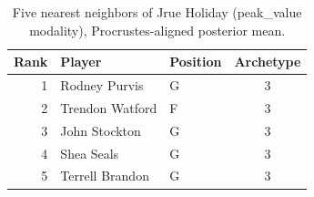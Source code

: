 \begin{table}[htbp]
  \centering\small
  \begin{tabular}{rllc}
    \toprule
    Rank & Player & Position & Archetype \\
    \midrule
    1 & Rodney Purvis & G & 3 \\
    2 & Trendon Watford & F & 3 \\
    3 & John Stockton & G & 3 \\
    4 & Shea Seals & G & 3 \\
    5 & Terrell Brandon & G & 3 \\
    \bottomrule
  \end{tabular}
  \caption{Five nearest neighbors of Jrue Holiday (peak_value modality), Procrustes-aligned posterior mean.}
  \label{tab:Jrue_Holiday_neighbors_peak_value}
\end{table}

